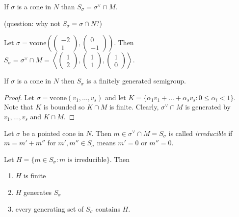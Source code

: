 \documentclass[a4paper,12pt]{amsart}
\begin{document}
\begin{Def}
If $\sigma$ is a cone in $N$ than $S_{\sigma} = \sigma^\vee \cap M$.
\end{Def}

(question: why not $S_\sigma = \sigma \cap N$?)

\begin{Eg}
Let $\sigma = \mathrm{vcone}\left(\begin{pmatrix}-2\\1\end{pmatrix}, \begin{pmatrix}0\\-1\end{pmatrix}\right)$.
Then $S_\sigma = \sigma^\vee \cap M = \left\langle \begin{pmatrix}1\\2\end{pmatrix}, \begin{pmatrix}1\\1\end{pmatrix}, \begin{pmatrix}1\\0\end{pmatrix} \right\rangle$.
\end{Eg}

\begin{Proposition}
If $\sigma$ is a cone in $N$ then $S_\sigma$ is a finitely generated semigroup.
\end{Proposition}

\begin{proof}
Let $\sigma = \mathrm{vcone}(v_1, \dots, v_s)$ and let $K = \{\alpha_1v_1 + \dots + \alpha_sv_s : 0 \le \alpha_i < 1\}$.
Note that $K$ is bounded so $K \cap M$ is finite.
Clearly, $\sigma^\vee \cap M$ is generated by $v_1, \dots, v_s$ and $K \cap M$.
\end{proof}

\begin{Def}
Let $\sigma$ be a pointed cone in $N$.
Then $m \in \sigma^\vee \cap M = S_\sigma$ is called \emph{irreducible} if $m = m' + m''$ for $m', m'' \in S_\sigma$ means $m' = 0$ or $m'' = 0$.
\end{Def}

\begin{Proposition}
Let $H = \{m \in S_\sigma : \text{$m$ is irreducible}\}$.
Then
\begin{enumerate}
\item $H$ is finite
\item $H$ generates $S_\sigma$
\item every generating set of $S_\sigma$ contains $H$.
\end{enumerate}
\end{Proposition}
\end{document}
